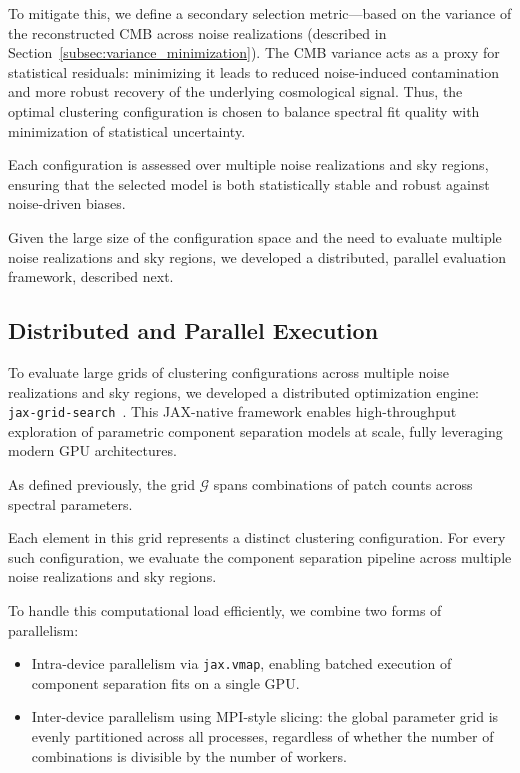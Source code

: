 \documentclass[%
 reprint,
bibnotes,
 amsmath,amssymb,
 aps,
floatfix, 
]{revtex4-2}
\begin{document}
To mitigate this, we define a secondary selection metric—based on the variance of the reconstructed CMB across noise realizations (described in Section~\ref{subsec:variance_minimization}). The CMB variance acts as a proxy for statistical residuals: minimizing it leads to reduced noise-induced contamination and more robust recovery of the underlying cosmological signal. Thus, the optimal clustering configuration is chosen to balance spectral fit quality with minimization of statistical uncertainty.

Each configuration is assessed over multiple noise realizations and sky regions, ensuring that the selected model is both statistically stable and robust against noise-driven biases.

Given the large size of the configuration space and the need to evaluate multiple noise realizations and sky regions, we developed a distributed, parallel evaluation framework, described next.


\subsection{Distributed and Parallel Execution}
\label{subsec:parallel_grid_search}

To evaluate large grids of clustering configurations across multiple noise realizations and sky regions, we developed a distributed optimization engine: \texttt{jax-grid-search}~\citep{kabalan2025jaxgridsearch}. This JAX-native framework enables high-throughput exploration of parametric component separation models at scale, fully leveraging modern GPU architectures.

As defined previously, the grid \( \mathcal{G} \) spans combinations of patch counts across spectral parameters. 

Each element in this grid represents a distinct clustering configuration. For every such configuration, we evaluate the component separation pipeline across multiple noise realizations and sky regions.

To handle this computational load efficiently, we combine two forms of parallelism:
\begin{itemize}
    \item Intra-device parallelism via \texttt{jax.vmap}, enabling batched execution of component separation fits on a single GPU.
    \item Inter-device parallelism using MPI-style slicing: the global parameter grid is evenly partitioned across all processes, regardless of whether the number of combinations is divisible by the number of workers.
\end{itemize}
\end{document}
